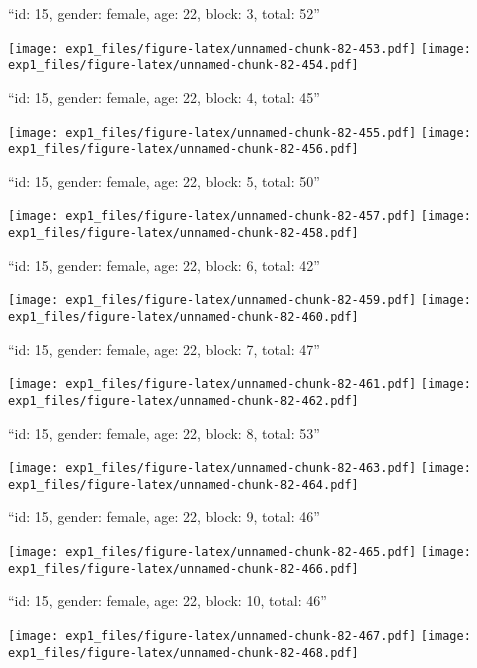 \documentclass[11pt,,]{article}
\begin{document}
\newpage
[1] 

``id: 15, gender: female, age: 22, block: 3, total: 52''

\texttt{[image: exp1\_files/figure-latex/unnamed-chunk-82-453.pdf]}
\texttt{[image: exp1\_files/figure-latex/unnamed-chunk-82-454.pdf]}

\newpage
[1] 

``id: 15, gender: female, age: 22, block: 4, total: 45''

\texttt{[image: exp1\_files/figure-latex/unnamed-chunk-82-455.pdf]}
\texttt{[image: exp1\_files/figure-latex/unnamed-chunk-82-456.pdf]}

\newpage
[1] 

``id: 15, gender: female, age: 22, block: 5, total: 50''

\texttt{[image: exp1\_files/figure-latex/unnamed-chunk-82-457.pdf]}
\texttt{[image: exp1\_files/figure-latex/unnamed-chunk-82-458.pdf]}

\newpage
[1] 

``id: 15, gender: female, age: 22, block: 6, total: 42''

\texttt{[image: exp1\_files/figure-latex/unnamed-chunk-82-459.pdf]}
\texttt{[image: exp1\_files/figure-latex/unnamed-chunk-82-460.pdf]}

\newpage
[1] 

``id: 15, gender: female, age: 22, block: 7, total: 47''

\texttt{[image: exp1\_files/figure-latex/unnamed-chunk-82-461.pdf]}
\texttt{[image: exp1\_files/figure-latex/unnamed-chunk-82-462.pdf]}

\newpage
[1] 

``id: 15, gender: female, age: 22, block: 8, total: 53''

\texttt{[image: exp1\_files/figure-latex/unnamed-chunk-82-463.pdf]}
\texttt{[image: exp1\_files/figure-latex/unnamed-chunk-82-464.pdf]}

\newpage
[1] 

``id: 15, gender: female, age: 22, block: 9, total: 46''

\texttt{[image: exp1\_files/figure-latex/unnamed-chunk-82-465.pdf]}
\texttt{[image: exp1\_files/figure-latex/unnamed-chunk-82-466.pdf]}

\newpage
[1] 

``id: 15, gender: female, age: 22, block: 10, total: 46''

\texttt{[image: exp1\_files/figure-latex/unnamed-chunk-82-467.pdf]}
\texttt{[image: exp1\_files/figure-latex/unnamed-chunk-82-468.pdf]}
\end{document}
